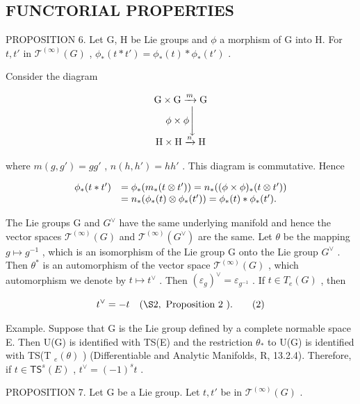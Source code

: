\subsection{FUNCTORIAL PROPERTIES}

PROPOSITION 6. Let G, H be Lie groups and \(\phi\) a morphism of G into H. For \(t, t'\) in \(\mathcal{T}^{(\infty)}(G)\) , \(\phi_{*}(t * t') = \phi_{*}(t) * \phi_{*}(t')\) .

Consider the diagram

\[
\begin{array}{c} \mathrm{G} \times \mathrm{G} \xrightarrow {m} \mathrm{G} \\ \phi \times \phi \Biggl \downarrow \\ \mathrm{H} \times \mathrm{H} \xrightarrow {n} \mathrm{H} \end{array}
\]

where \(m(g, g') = gg'\) , \(n(h, h') = hh'\) . This diagram is commutative. Hence

\[
\begin{array}{r l} \phi_ {*} (t * t ^ {\prime}) & = \phi_ {*} (m _ {*} (t \otimes t ^ {\prime})) = n _ {*} ((\phi \times \phi) _ {*} (t \otimes t ^ {\prime})) \\ & = n _ {*} (\phi_ {*} (t) \otimes \phi_ {*} (t ^ {\prime})) = \phi_ {*} (t) * \phi_ {*} (t ^ {\prime}). \end{array}
\]

The Lie groups G and \(G^{\vee}\) have the same underlying manifold and hence the vector spaces \(\mathcal{T}^{(\infty)}(G)\) and \(\mathcal{T}^{(\infty)}(G^{\vee})\) are the same. Let \(\theta\) be the mapping \(g \mapsto g^{-1}\) , which is an isomorphism of the Lie group G onto the Lie group \(G^{\vee}\) . Then \(\theta^{*}\) is an automorphism of the vector space \(\mathcal{T}^{(\infty)}(G)\) , which automorphism we denote by \(t \mapsto t^{\vee}\) . Then \((\varepsilon_{g})^{\vee} = \varepsilon_{g^{-1}}\) . If \(t \in T_{e}(G)\) , then

\[
t ^ {\vee} = - t \quad (\S 2, \text { Proposition   2 }).\tag{2}
\]

Example. Suppose that G is the Lie group defined by a complete normable space E. Then U(G) is identified with TS(E) and the restriction \(\theta_{*}\) to U(G) is identified with TS(T \(_{e}(\theta)\) ) (Differentiable and Analytic Manifolds, R, 13.2.4). Therefore, if \(t \in \mathsf{TS}^{s}(E)\) , \(t^{\vee} = (-1)^{s}t\) .

PROPOSITION 7. Let G be a Lie group. Let \(t, t'\) be in \(\mathcal{T}^{(\infty)}(G)\) .

